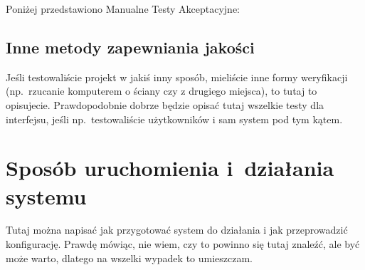 Poniżej przedstawiono Manualne Testy Akceptacyjne:

\matpres
{}
\matsteps
{}

\matpres
{}
\matsteps
{}

\subsection{Inne metody zapewniania jakości}
\label{Chapter714}

Jeśli testowaliście projekt w jakiś inny sposób, mieliście inne formy weryfikacji (np.~rzucanie komputerem o ściany czy z drugiego miejsca), to tutaj to opisujecie. Prawdopodobnie dobrze będzie opisać tutaj wszelkie testy dla interfejsu, jeśli np.~testowaliście użytkowników i sam system pod tym kątem.

\section{Sposób uruchomienia i~działania systemu}
\label{Chapter72}

Tutaj można napisać jak przygotować system do działania i jak przeprowadzić konfigurację. Prawdę mówiąc, nie wiem, czy to powinno się tutaj znaleźć, ale być może warto, dlatego na wszelki wypadek to umieszczam.
